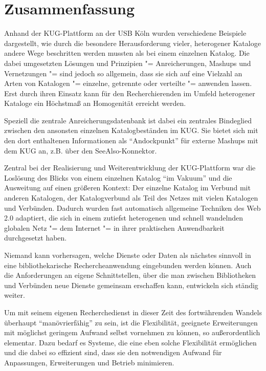 \documentclass[11pt]{scrartcl}
\begin{document}
\section{Zusammenfassung}

Anhand der KUG-Plattform an der USB Köln wurden verschiedene Beispiele
dargestellt, wie durch die besondere Herausforderung vieler,
heterogener Kataloge andere Wege beschritten werden mussten als bei
einem einzelnen Katalog. Die dabei umgesetzten Lösungen und Prinzipien
"= Anreicherungen, Mashups und Vernetzungen "= sind jedoch so
allgemein, dass sie sich auf eine Vielzahl an Arten von Katalogen "=
einzelne, getrennte oder verteilte "= anwenden lassen. Erst durch
ihren Einsatz kann für den Recherchierenden im Umfeld heterogener
Kataloge ein Höchstmaß an Homogenität erreicht werden.

Speziell die zentrale Anreicherungsdatenbank ist dabei ein zentrales
Bindeglied zwischen den ansonsten einzelnen Katalogbeständen im KUG.
Sie bietet sich mit den dort enthaltenen Informationen als
"`Andockpunkt"' für externe Mashups mit dem KUG an, z.B. über den
SeeAlso-Konnektor.

Zentral bei der Realisierung und Weiterentwicklung der KUG-Plattform
war die Loslösung des Blicks von einem einzelnen Katalog "`im Vakuum"'
und die Ausweitung auf einen größeren Kontext: Der einzelne Katalog im
Verbund mit anderen Katalogen, der Katalogverbund als Teil des Netzes
mit vielen Katalogen und Verbünden. Dadurch wurden fast automatisch
allgemeine Techniken des Web 2.0 adaptiert, die sich in einem zutiefst
heterogenen und schnell wandelnden globalen Netz "= dem Internet "= in
ihrer praktischen Anwendbarkeit durchgesetzt haben.

Niemand kann vorhersagen, welche Dienste oder Daten als nächstes
sinnvoll in eine bibliothekarische Rechercheanwendung eingebunden
werden können. Auch die Anforderungen an eigene Schnittstellen, über
die man zwischen Bibliotheken und Verbünden neue Dienste gemeinsam
erschaffen kann, entwickeln sich ständig weiter.

Um mit seinem eigenen Recherchedienst in dieser Zeit des fortwährenden
Wandels überhaupt "`manövrierfähig"' zu sein, ist die Flexibilität,
geeignete Erweiterungen mit möglichst geringem Aufwand selbst
vornehmen zu können, so außerordentlich elementar. Dazu bedarf es
Systeme, die eine eben solche Flexibilität ermöglichen und die dabei
so effizient sind, dass sie den notwendigen Aufwand für Anpassungen,
Erweiterungen und Betrieb minimieren.
\end{document}
